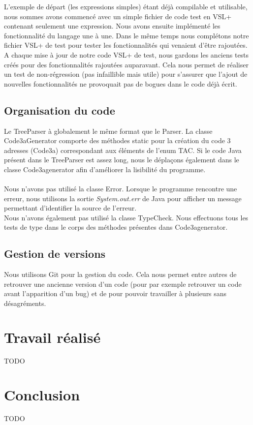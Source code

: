 \documentclass[a4paper, 11pt, oneside]{article}
\begin{document}
L'exemple de départ (les expressions simples) étant déjà compilable et utilisable, nous sommes avons commencé avec un simple fichier de code test en VSL+ contenant seulement une expression.
Nous avons ensuite implémenté les fonctionnalité du langage une à une. Dans le même temps nous complétons notre fichier VSL+ de test pour tester les fonctionnalités qui venaient d'être rajoutées. A chaque mise à jour de notre code VSL+ de test, nous gardons les anciens tests créés pour des fonctionnalités rajoutées auparavant. Cela nous permet de réaliser un test de non-régression (pas infaillible mais utile) pour s'assurer que l'ajout de nouvelles fonctionnalités ne provoquait pas de bogues dans le code déjà écrit. 

\subsection{Organisation du code}

Le TreeParser à globalement le même format que le Parser. 
La classe Code3aGenerator comporte des méthodes static pour la création du code 3 adresses (Code3a) correspondant aux éléments de l'enum TAC.
Si le code Java présent dans le TreeParser est assez long, nous le déplaçons également dans le classe Code3agenerator afin d'améliorer la lisibilité du programme.
\\
\\
Nous n'avons pas utilisé la classe Error. Lorsque le programme rencontre une erreur, nous utilisons la sortie \textit{System.out.err} de Java pour afficher un message permettant d'identifier la source de l'erreur.
\\
Nous n'avons également pas utilisé la classe TypeCheck. Nous effectuons tous les tests de type dans le corps des méthodes présentes dans Code3agenerator.

\subsection{Gestion de versions}

Nous utilisons Git pour la gestion du code. Cela nous permet entre autres de retrouver une ancienne version d'un code (pour par exemple retrouver un code avant l'apparition d'un bug) et de pour pouvoir travailler à plusieurs sans désagréments. 


\section{Travail réalisé}

TODO

\section*{Conclusion}

TODO
\end{document}

